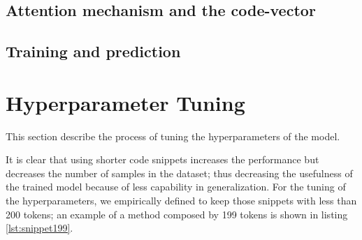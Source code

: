 \subsection{Attention mechanism and the code-vector}

\subsection{Training and prediction}






\section{Hyperparameter Tuning}

This section describe the process of tuning the hyperparameters of the model.

It is clear that using shorter code snippets increases the performance but decreases the number of samples in the dataset; thus decreasing the usefulness of the trained model because of less capability in generalization.
For the tuning of the hyperparameters, we empirically defined to keep those snippets with less than 200 tokens; an example of a method composed by 199 tokens is shown in listing \ref{lst:snippet199}.

